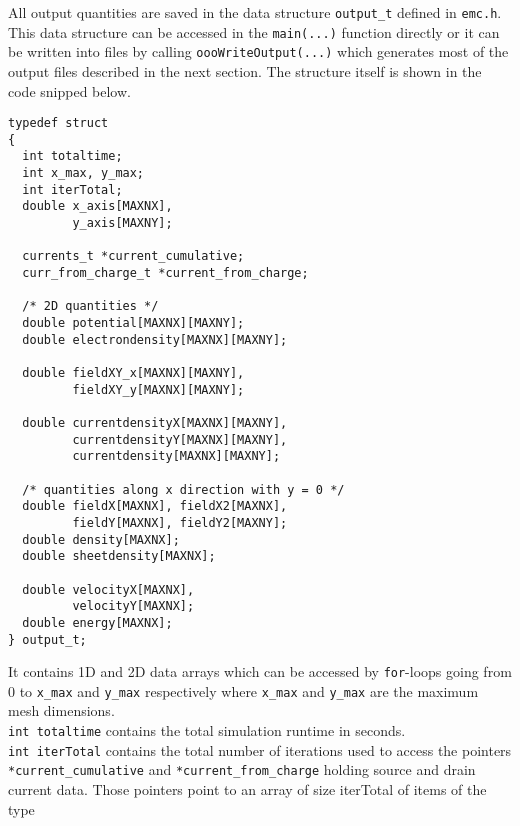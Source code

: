 All output quantities are saved in the data structure \texttt{output\_t} defined in \texttt{emc.h}. This data structure can be accessed in the \texttt{main(...)} function directly or it can be written into files by calling \texttt{oooWriteOutput(...)} which generates most of the output files described in the next section. The structure itself is shown in the code snipped below.

\begin{verbatim}
typedef struct
{
  int totaltime;
  int x_max, y_max;
  int iterTotal;
  double x_axis[MAXNX],
         y_axis[MAXNY];

  currents_t *current_cumulative;
  curr_from_charge_t *current_from_charge;

  /* 2D quantities */
  double potential[MAXNX][MAXNY];
  double electrondensity[MAXNX][MAXNY];

  double fieldXY_x[MAXNX][MAXNY],
         fieldXY_y[MAXNX][MAXNY];

  double currentdensityX[MAXNX][MAXNY],
         currentdensityY[MAXNX][MAXNY],
         currentdensity[MAXNX][MAXNY];

  /* quantities along x direction with y = 0 */
  double fieldX[MAXNX], fieldX2[MAXNX],
         fieldY[MAXNX], fieldY2[MAXNY];
  double density[MAXNX];
  double sheetdensity[MAXNX];

  double velocityX[MAXNX],
         velocityY[MAXNX];
  double energy[MAXNX];
} output_t;
\end{verbatim}

It contains 1D and 2D data arrays which can be accessed by \texttt{for}-loops going from 0 to \texttt{x\_max} and \texttt{y\_max} respectively where \texttt{x\_max} and \texttt{y\_max} are the maximum mesh dimensions. \\
\texttt{int totaltime} contains the total simulation runtime in seconds. \\
\texttt{int iterTotal} contains the total number of iterations used to access the pointers \\
\texttt{*current\_cumulative} and \texttt{*current\_from\_charge} holding source and drain current data. Those pointers point to an array of size iterTotal of items of the type

